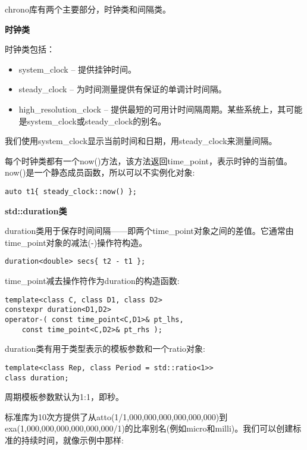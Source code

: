 chrono库有两个主要部分，时钟类和间隔类。

\noindent
\textbf{时钟类}

时钟类包括：

\begin{itemize}
\item 
system\_clock – 提供挂钟时间。

\item 
steady\_clock – 为时间测量提供有保证的单调计时间隔。

\item 
high\_resolution\_clock – 提供最短的可用计时间隔周期。某些系统上，其可能是system\_clock或steady\_clock的别名。

\end{itemize}

我们使用system\_clock显示当前时间和日期，用steady\_clock来测量间隔。

每个时钟类都有一个now()方法，该方法返回time\_point，表示时钟的当前值。now()是一个静态成员函数，所以可以不实例化对象:

\begin{lstlisting}[style=styleCXX]
auto t1{ steady_clock::now() };
\end{lstlisting}

\noindent
\textbf{std::duration类}

duration类用于保存时间间隔——即两个time\_point对象之间的差值。它通常由time\_point对象的减法(-)操作符构造。

\begin{lstlisting}[style=styleCXX]
duration<double> secs{ t2 - t1 };
\end{lstlisting}

time\_point减去操作符作为duration的构造函数:

\begin{lstlisting}[style=styleCXX]
template<class C, class D1, class D2>
constexpr duration<D1,D2>
operator-( const time_point<C,D1>& pt_lhs,
	const time_point<C,D2>& pt_rhs );
\end{lstlisting}

duration类有用于类型表示的模板参数和一个ratio对象:

\begin{lstlisting}[style=styleCXX]
template<class Rep, class Period = std::ratio<1>>
class duration;
\end{lstlisting}

周期模板参数默认为1:1，即秒。

标准库为10次方提供了从atto(1/1,000,000,000,000,000,000)到exa(1,000,000,000,000,000,000/1)的比率别名(例如micro和milli)。我们可以创建标准的持续时间，就像示例中那样:

